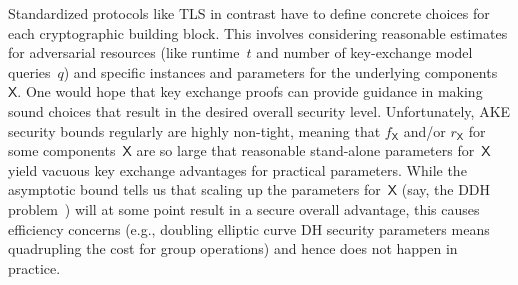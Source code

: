 Standardized protocols like TLS in contrast have to define concrete choices for each cryptographic building block.
This involves considering reasonable estimates for adversarial resources (like runtime~$t$ and number of key-exchange model queries~$q$) and specific instances and parameters for the underlying components~$\mathsf{X}$.
One would hope that key exchange proofs can provide guidance in making sound choices that result in the desired overall security level.
Unfortunately, AKE security bounds regularly are highly non-tight, meaning that $f_\mathsf{X}$ and/or $r_\mathsf{X}$ for some components~$\mathsf{X}$ are so large that reasonable stand-alone parameters for~$\mathsf{X}$ yield vacuous key exchange advantages for practical parameters.
While the asymptotic bound tells us that scaling up the parameters for~$\mathsf{X}$ (say, the DDH problem~\cite{Boneh98}) will at some point result in a secure overall advantage,
this causes efficiency concerns (e.g., doubling elliptic curve DH security parameters means quadrupling the cost for group operations) and hence does not happen in practice.
